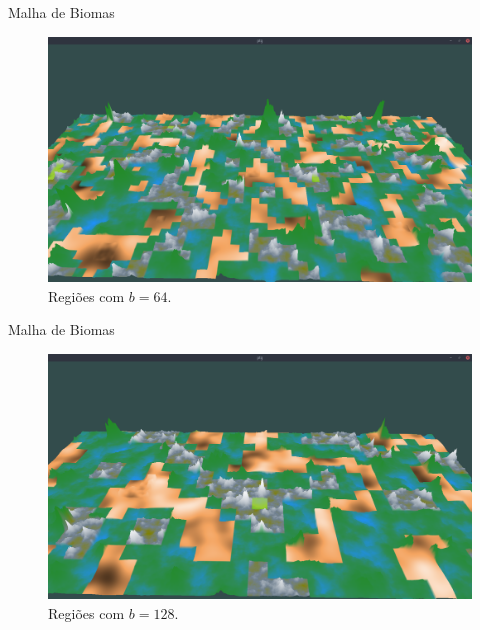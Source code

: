 \begin{frame}{Malha de Biomas}
    \begin{figure}[H]
        \centering
        \includegraphics[width=.9\textwidth]{img/re2bfb/b/64f4.png}
        \caption{Regiões com $b = 64$.}
        \label{fig:img_re2bfb_b_64f4}
    \end{figure}
    
    
\end{frame}

\begin{frame}{Malha de Biomas}
    \begin{figure}[H]
        \centering
        \includegraphics[width=.9\textwidth]{img/re2bfb/b/128f4.png}
        \caption{Regiões com $b = 128$.}
        \label{fig:img_re2bfb_b_128f4}
    \end{figure}
    
    
\end{frame}

